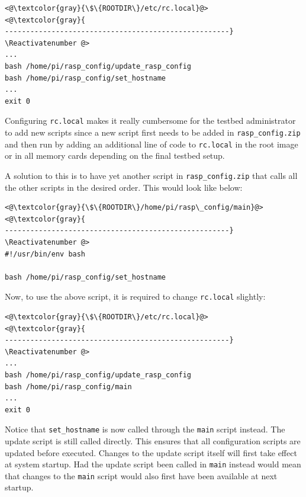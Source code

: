 \Suppressnumber\begin{lstlisting}[]
<@\textcolor{gray}{\$\{ROOTDIR\}/etc/rc.local}@>
<@\textcolor{gray}{
-----------------------------------------------------}
\Reactivatenumber @>
...
bash /home/pi/rasp_config/update_rasp_config
bash /home/pi/rasp_config/set_hostname
...
exit 0
\end{lstlisting}
\FloatBarrier
\vspace{-5mm}

Configuring \texttt{rc.local} makes it really cumbersome for the testbed
administrator to add new scripts since a new script first needs to be added
in \texttt{rasp\_config.zip} and then run by adding an additional line of code
to \texttt{rc.local} in the root image or in all memory cards depending on
the final testbed setup.

A solution to this is to have yet another script in \texttt{rasp\_config.zip}
that calls all the other scripts in the desired order. This would look like
below:
\Suppressnumber\begin{lstlisting}[]
<@\textcolor{gray}{\$\{ROOTDIR\}/home/pi/rasp\_config/main}@>
<@\textcolor{gray}{
-----------------------------------------------------}
\Reactivatenumber @>
#!/usr/bin/env bash

bash /home/pi/rasp_config/set_hostname
\end{lstlisting}
\FloatBarrier
\vspace{-5mm}

Now, to use the above script, it is required to change \texttt{rc.local}
slightly:
\Suppressnumber\begin{lstlisting}[]
<@\textcolor{gray}{\$\{ROOTDIR\}/etc/rc.local}@>
<@\textcolor{gray}{
-----------------------------------------------------}
\Reactivatenumber @>
...
bash /home/pi/rasp_config/update_rasp_config
bash /home/pi/rasp_config/main
...
exit 0
\end{lstlisting}
\FloatBarrier
\vspace{-5mm}
Notice that \texttt{set\_hostname} is now called through the \texttt{main}
script instead. The update script is still called directly. This ensures that
all configuration scripts are updated before executed. Changes to the update
script itself will first take effect at system startup. Had the update script
been called in \texttt{main} instead would mean that changes to the 
\texttt{main} script would also first have been available at next startup.

%

